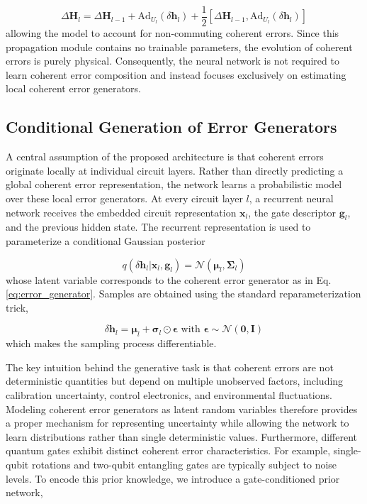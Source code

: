 \begin{equation}
    \Delta\mathbf{H}_l = \Delta\mathbf{H}_{l-1} + \mathrm{Ad}_{U_l}(\delta\mathbf{h}_l) + \frac{1}{2}
    \left[ \Delta\mathbf{H}_{l-1}, \mathrm{Ad}_{U_l}(\delta\mathbf{h}_l)\right]
\end{equation}
allowing the model to account for non-commuting coherent errors. Since this propagation module contains no trainable parameters, the evolution of coherent errors is purely physical. Consequently, the neural network is not required to learn coherent error composition and instead focuses exclusively on estimating local coherent error generators.

\subsection{Conditional Generation of Error Generators}

A central assumption of the proposed architecture is that coherent errors originate locally at individual circuit layers. Rather than directly predicting a global coherent error representation, the network learns a probabilistic model over these local error generators.
At every circuit layer $l$, a recurrent neural network receives the embedded circuit representation $\mathbf{x}_l$, the gate descriptor $\mathbf{g}_l$, and the previous hidden state. The recurrent representation is used to parameterize a conditional Gaussian posterior

\begin{equation}
    q(\delta\mathbf{h}_l|\mathbf{x}_l,\mathbf{g}_l) = \mathcal{N}(\boldsymbol{\mu}_l,\mathbf{\Sigma}_l)
\end{equation}
whose latent variable corresponds to the coherent error generator as in Eq. \ref{eq:error_generator}. Samples are obtained using the standard reparameterization trick,

\begin{equation}
    \delta\mathbf{h}_l = \boldsymbol{\mu}_l + \boldsymbol{\sigma}_l \odot \boldsymbol{\epsilon}
    \text{  with  }
    \boldsymbol{\epsilon} \sim \mathcal{N}(\mathbf{0}, \mathbf{I})
\end{equation}
which makes the sampling process differentiable.

The key intuition behind the generative task is that coherent errors are not deterministic quantities but depend on multiple unobserved factors, including calibration uncertainty, control electronics, and environmental fluctuations. Modeling coherent error generators as latent random variables therefore provides a proper mechanism for representing uncertainty while allowing the network to learn distributions rather than single deterministic values.
Furthermore, different quantum gates exhibit distinct coherent error characteristics. For example, single-qubit rotations and two-qubit entangling gates are typically subject to noise levels. To encode this prior knowledge, we introduce a gate-conditioned prior network,

